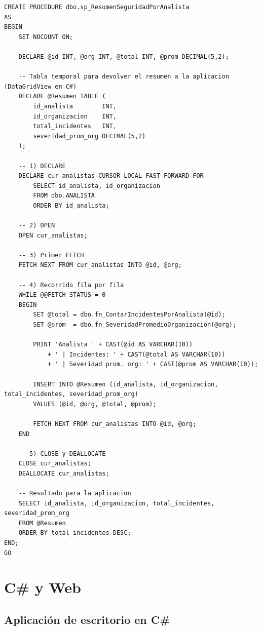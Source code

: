 \documentclass[11pt,a4paper]{article}
\begin{document}
\begin{lstlisting}
CREATE PROCEDURE dbo.sp_ResumenSeguridadPorAnalista
AS
BEGIN
    SET NOCOUNT ON;

    DECLARE @id INT, @org INT, @total INT, @prom DECIMAL(5,2);

    -- Tabla temporal para devolver el resumen a la aplicacion (DataGridView en C#)
    DECLARE @Resumen TABLE (
        id_analista        INT,
        id_organizacion    INT,
        total_incidentes   INT,
        severidad_prom_org DECIMAL(5,2)
    );

    -- 1) DECLARE
    DECLARE cur_analistas CURSOR LOCAL FAST_FORWARD FOR
        SELECT id_analista, id_organizacion
        FROM dbo.ANALISTA
        ORDER BY id_analista;

    -- 2) OPEN
    OPEN cur_analistas;

    -- 3) Primer FETCH
    FETCH NEXT FROM cur_analistas INTO @id, @org;

    -- 4) Recorrido fila por fila
    WHILE @@FETCH_STATUS = 0
    BEGIN
        SET @total = dbo.fn_ContarIncidentesPorAnalista(@id);
        SET @prom  = dbo.fn_SeveridadPromedioOrganizacion(@org);

        PRINT 'Analista ' + CAST(@id AS VARCHAR(10))
            + ' | Incidentes: ' + CAST(@total AS VARCHAR(10))
            + ' | Severidad prom. org: ' + CAST(@prom AS VARCHAR(10));

        INSERT INTO @Resumen (id_analista, id_organizacion, total_incidentes, severidad_prom_org)
        VALUES (@id, @org, @total, @prom);

        FETCH NEXT FROM cur_analistas INTO @id, @org;
    END

    -- 5) CLOSE y DEALLOCATE
    CLOSE cur_analistas;
    DEALLOCATE cur_analistas;

    -- Resultado para la aplicacion
    SELECT id_analista, id_organizacion, total_incidentes, severidad_prom_org
    FROM @Resumen
    ORDER BY total_incidentes DESC;
END;
GO
\end{lstlisting}

\section{C\# y Web}

\subsection{Aplicación de escritorio en C\#}
\end{document}

